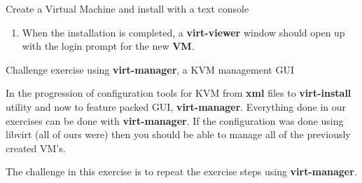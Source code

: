 \begin{Lab}
\begin{exe}  {Create a Virtual Machine and install with a text console}
\begin{sol}
\begin{enumerate}
\begin{raw}
 virt-install \
	--name deb9 \
	--memory 2048 \
	--disk /var/lib/libvirt/images/deb9.qcow2 --vcpus 2 \
	--os-type linux \
	--os-variant debian9 \
	--boot useserial=on  \
	--cdrom /var/ftp/pub/iso/debian-9.5.0-amd64-DVD-1.iso

		\end{raw}
		\item When the installation is completed, a 
			\textbf{virt-viewer} window should open up 
			with the login prompt for the new \textbf{VM}.
			
	\end{enumerate}

	\end{sol}

\end{exe}

\begin{exe} {Challenge exercise using \textbf{virt-manager}, a KVM management GUI}

	In the progression of configuration tools for KVM from \textbf{xml} files
	to \textbf{virt-install} utility and now to feature packed GUI, 
	\textbf{virt-manager}. 
	Everything done in our exercises can be done with \textbf{virt-manager}. If 
	the configuration was done using libvirt (all of ours were) then
	you should be able to manage all of the previously created VM's. 

	The challenge in this exercise is to repeat the exercise steps 
	using \textbf{virt-manager}.

\end{exe}

\end{Lab}

